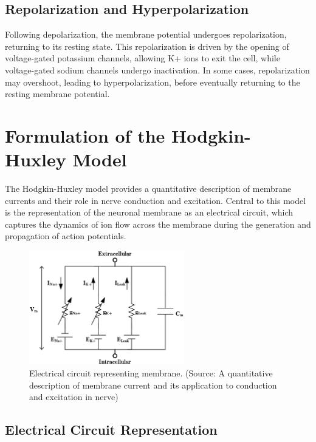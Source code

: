 \documentclass[12pt,a4paper]{report}
\begin{document}
\subsection{Repolarization and Hyperpolarization}

Following depolarization, the membrane potential undergoes repolarization, returning to its resting state. This repolarization is driven by the opening of voltage-gated potassium channels, allowing K+ ions to exit the cell, while voltage-gated sodium channels undergo inactivation. In some cases, repolarization may overshoot, leading to hyperpolarization, before eventually returning to the resting membrane potential\cite{principles_of_neural_science}.

\section{Formulation of the Hodgkin-Huxley Model}

The Hodgkin-Huxley model provides a quantitative description of membrane currents and their role in nerve conduction and excitation. Central to this model is the representation of the neuronal membrane as an electrical circuit, which captures the dynamics of ion flow across the membrane during the generation and propagation of action potentials.

\begin{figure}[htbp]
    \centering
    \includegraphics[width=0.6\textwidth]{./data/electrical_circuit_representing membrane.png}
    \caption{Electrical circuit representing membrane. (Source: A quantitative description of membrane current and its application to conduction and excitation in nerve\cite{Hodgkin1952})}
    \label{fig:electrical_circuit_representing membrane.}
\end{figure}

\subsection{Electrical Circuit Representation}
\end{document}
